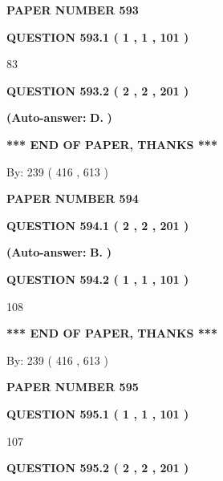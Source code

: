 \documentclass[12pt]{article}
\begin{document}
   
\newpage 
\setcounter{page}{ 
   593001 } 
   
   
 {\textbf{ \Large{ PAPER NUMBER  593  }}}
   
   
   
   
  
  
{\textbf{\large{QUESTION
593.1 
 ( 1 , 1 , 101 )
}}}

83
  
  
{\textbf{\large{QUESTION
593.2 
 ( 2 , 2 , 201 )
}}}
 
 
{\textbf{(Auto-answer:}}
{\textbf{\large{
D.}}}
{\textbf{)}}
 
 
   
   
   
   
\vspace{1.0in} 
{\textbf{\large{ *** END OF PAPER, THANKS *** }}} 
   
   
\hspace{1.0in} By: 
 239 ( 416 ,  613 )
   
   
   
   
\newpage 
\setcounter{page}{ 
   594001 } 
   
   
 {\textbf{ \Large{ PAPER NUMBER  594  }}}
   
   
   
   
  
  
{\textbf{\large{QUESTION
594.1 
 ( 2 , 2 , 201 )
}}}
 
 
{\textbf{(Auto-answer:}}
{\textbf{\large{
B.}}}
{\textbf{)}}
 
 
  
  
{\textbf{\large{QUESTION
594.2 
 ( 1 , 1 , 101 )
}}}

108
   
   
   
   
\vspace{1.0in} 
{\textbf{\large{ *** END OF PAPER, THANKS *** }}} 
   
   
\hspace{1.0in} By: 
 239 ( 416 ,  613 )
   
   
   
   
\newpage 
\setcounter{page}{ 
   595001 } 
   
   
 {\textbf{ \Large{ PAPER NUMBER  595  }}}
   
   
   
   
  
  
{\textbf{\large{QUESTION
595.1 
 ( 1 , 1 , 101 )
}}}

107
  
  
{\textbf{\large{QUESTION
595.2 
 ( 2 , 2 , 201 )
}}}
 
\end{document}
